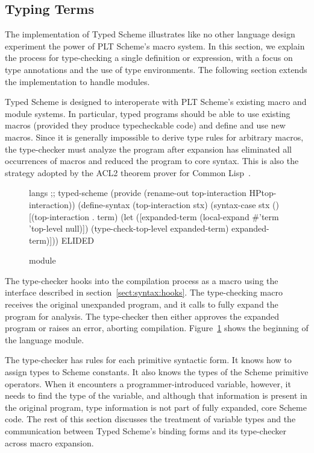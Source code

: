 \begin{schemeregion}
\section{Typing Terms}
\label{sect:type-one}

The implementation of Typed Scheme illustrates like no other language
design experiment the power of PLT Scheme's macro system. In this
section, we explain the process for type-checking a single definition
or expression, with a focus on type annotations and the use of type
environments. The following section extends the implementation to
handle modules.

Typed Scheme is designed to interoperate with PLT Scheme's existing
macro and module systems. In particular, typed programs should be able
to use existing macros (provided they produce typecheckable code) and
define and use new macros. Since it is generally impossible to derive
type rules for arbitrary macros, the type-checker must analyze the
program after expansion has eliminated all occurrences of macros and
reduced the program to core syntax.  This is also the strategy adopted
by the ACL2 theorem prover for Common Lisp~\cite{acl2-book}.   

\begin{figure}
\begin{schemedisplay}
langs ;; typed-scheme
(provide (rename-out top-interaction HPtop-interaction))
(define-syntax (top-interaction stx)
  (syntax-case stx ()
    [(top-interaction . term)
     (let ([expanded-term
	    (local-expand #'term 'top-level null)])
       (type-check-top-level expanded-term)
       expanded-term)]))
ELIDED
\end{schemedisplay}
\caption{ module}
\label{fig:first-typed-scheme-module}
\end{figure}

The type-checker hooks into the compilation process as a macro using
the  interface described in
section~\ref{sect:syntax:hooks}. The type-checking macro receives the
original unexpanded program, and it calls  to
fully expand the program for analysis. The type-checker then either
approves the expanded program or raises an error, aborting
compilation. Figure~\ref{fig:first-typed-scheme-module}
shows the beginning of the  language module.

The type-checker has rules for each primitive syntactic form. It knows
how to assign types to Scheme constants. It also knows the types of
the Scheme primitive operators.
%
When it encounters a programmer-introduced variable, however, it needs
to find the type of the variable, and although that information is
present in the original program, type information is not part of fully
expanded, core Scheme code.
%
The rest of this section discusses the treatment of variable types and
the communication between Typed Scheme's binding forms and its
type-checker across macro expansion.


\end{schemeregion}
